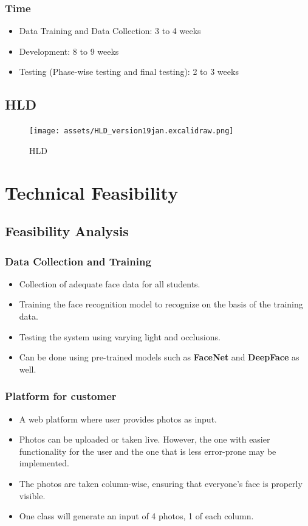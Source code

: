 \documentclass[a4paper,12pt]{article}
\begin{document}
\subsubsection{Time}
\begin{itemize}
    \item Data Training and Data Collection: 3 to 4 weeks
    \item Development: 8 to 9 weeks
    \item Testing (Phase-wise testing and final testing): 2 to 3 weeks
\end{itemize}

\subsection{HLD}
\begin{figure}[h]
    \centering
    \texttt{[image: assets/HLD\_version19jan.excalidraw.png]}
    \caption{HLD}
    \label{fig:hld_diagram}
\end{figure}


\newpage

\section{Technical Feasibility}
\subsection{Feasibility Analysis}
\subsubsection{Data Collection and Training}
\begin{itemize}
    \item Collection of adequate face data for all students.
    \item Training the face recognition model to recognize on the basis of the training data.
    \item Testing the system using varying light and occlusions.
    \item Can be done using pre-trained models such as \textbf{FaceNet} and \textbf{DeepFace} as well.
\end{itemize}

\subsubsection{Platform for customer}
\begin{itemize}
    \item A web platform where user provides photos as input.
    \item Photos can be uploaded or taken live. However, the one with easier functionality for the user and the one that is less error-prone may be implemented.
    \item The photos are taken column-wise, ensuring that everyone's face is properly visible.
    \item One class will generate an input of 4 photos, 1 of each column. 
\end{itemize}
\end{document}
